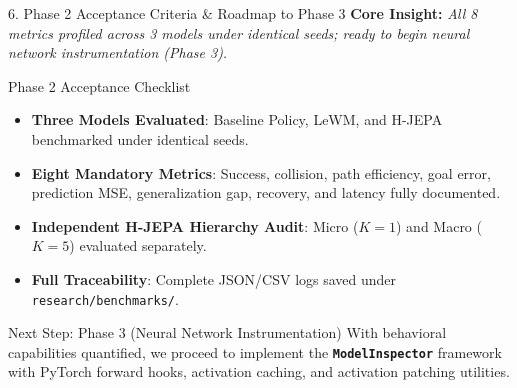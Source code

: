 \documentclass[aspectratio=169, 10pt]{beamer}
\begin{document}
\begin{frame}{6. Phase 2 Acceptance Criteria \& Roadmap to Phase 3}
  \textbf{Core Insight:} \textit{All 8 metrics profiled across 3 models under identical seeds; ready to begin neural network instrumentation (Phase 3).}

  \vspace{0.3cm}
  \begin{block}{Phase 2 Acceptance Checklist}
    \small
    \begin{itemize}
      \item[\checkmark] \textbf{Three Models Evaluated}: Baseline Policy, LeWM, and H-JEPA benchmarked under identical seeds.
      \item[\checkmark] \textbf{Eight Mandatory Metrics}: Success, collision, path efficiency, goal error, prediction MSE, generalization gap, recovery, and latency fully documented.
      \item[\checkmark] \textbf{Independent H-JEPA Hierarchy Audit}: Micro ($K=1$) and Macro ($K=5$) evaluated separately.
      \item[\checkmark] \textbf{Full Traceability}: Complete JSON/CSV logs saved under \texttt{research/benchmarks/}.
    \end{itemize}
  \end{block}

  \vspace{0.2cm}
  \begin{alertblock}{Next Step: Phase 3 (Neural Network Instrumentation)}
    \small
    With behavioral capabilities quantified, we proceed to implement the \textbf{\texttt{ModelInspector}} framework with PyTorch forward hooks, activation caching, and activation patching utilities.
  \end{alertblock}
\end{frame}
\end{document}
